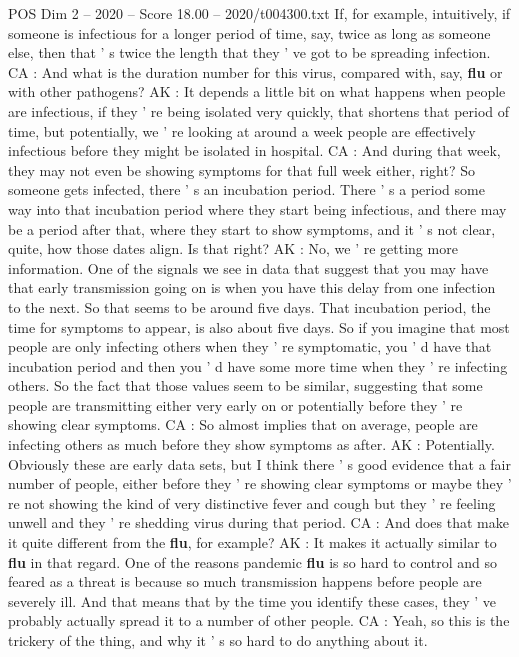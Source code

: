 \begin{textsample}{POS Dim 2 – 2020 – Score 18.00 – 2020/t004300.txt}
If, for example, intuitively, if someone is infectious for a longer period of time, say, twice as long as someone else, then that ' s twice the length that they ' ve got to be spreading infection.
CA : And what is the duration number for this virus, compared with, say, \textbf{flu} or with other pathogens?
AK : It depends a little bit on what happens when people are infectious, if they ' re being isolated very quickly, that shortens that period of time, but potentially, we ' re looking at around a week people are effectively infectious before they might be isolated in hospital.
CA : And during that week, they may not even be showing symptoms for that full week either, right?
So someone gets infected, there ' s an incubation period.
There ' s a period some way into that incubation period where they start being infectious, and there may be a period after that, where they start to show symptoms, and it ' s not clear, quite, how those dates align.
Is that right?
AK : No, we ' re getting more information.
One of the signals we see in data that suggest that you may have that early transmission going on is when you have this delay from one infection to the next.
So that seems to be around five days.
That incubation period, the time for symptoms to appear, is also about five days.
So if you imagine that most people are only infecting others when they ' re symptomatic, you ' d have that incubation period and then you ' d have some more time when they ' re infecting others.
So the fact that those values seem to be similar, suggesting that some people are transmitting either very early on or potentially before they ' re showing clear symptoms.
CA : So almost implies that on average, people are infecting others as much before they show symptoms as after.
AK : Potentially.
Obviously these are early data sets, but I think there ' s good evidence that a fair number of people, either before they ' re showing clear symptoms or maybe they ' re not showing the kind of very distinctive fever and cough but they ' re feeling unwell and they ' re shedding virus during that period.
CA : And does that make it quite different from the \textbf{flu}, for example?
AK : It makes it actually similar to \textbf{flu} in that regard.
One of the reasons pandemic \textbf{flu} is so hard to control and so feared as a threat is because so much transmission happens before people are severely ill.
And that means that by the time you identify these cases, they ' ve probably actually spread it to a number of other people.
CA : Yeah, so this is the trickery of the thing, and why it ' s so hard to do anything about it.

\end{textsample}
